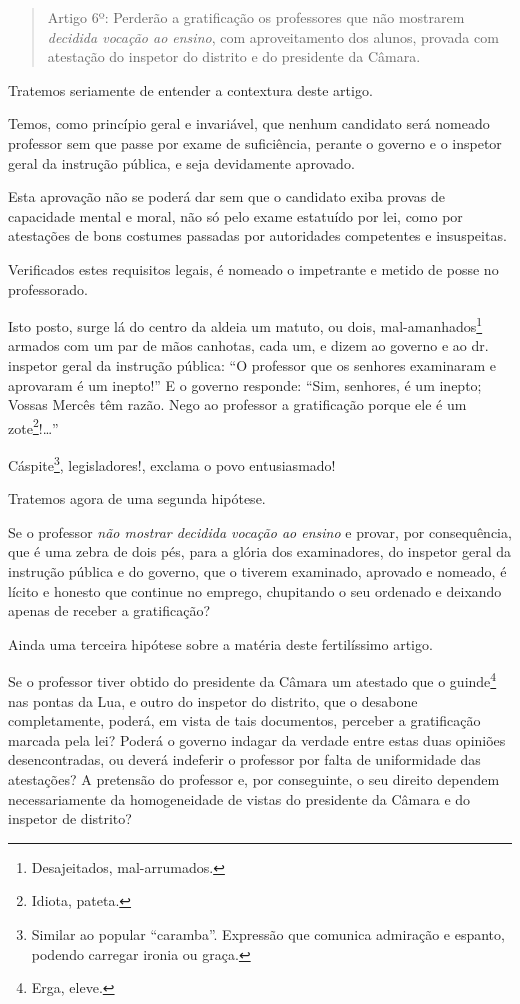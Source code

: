 \begin{quote}
Artigo 6º: Perderão a gratificação os professores que não mostrarem
\emph{decidida vocação ao ensino}, com aproveitamento dos alunos,
provada com atestação do inspetor do distrito e do presidente da
Câmara.
\end{quote}

Tratemos seriamente de entender a contextura deste artigo.

Temos, como princípio geral e invariável, que nenhum candidato será
nomeado professor sem que passe por exame de suficiência, perante o
governo e o inspetor geral da instrução pública, e seja devidamente
aprovado.

Esta aprovação não se poderá dar sem que o candidato exiba provas de
capacidade mental e moral, não só pelo exame estatuído por lei, como por
atestações de bons costumes passadas por autoridades competentes e
insuspeitas.

Verificados estes requisitos legais, é nomeado o impetrante e metido de
posse no professorado.

Isto posto, surge lá do centro da aldeia um matuto, ou dois,
mal-amanhados\footnote{Desajeitados, mal-arrumados.} armados com um
par de mãos canhotas, cada um, e dizem ao governo e ao dr.\,inspetor
geral da instrução pública: ``O professor que os senhores examinaram e
aprovaram é um inepto!'' E o governo responde: ``Sim, senhores, é um
inepto; Vossas Mercês têm razão. Nego ao professor a gratificação porque
ele é um zote\footnote{Idiota, pateta.}!\ldots{}''

Cáspite\footnote{Similar ao popular ``caramba''. Expressão que comunica
  admiração e espanto, podendo carregar ironia ou graça.},
legisladores!, exclama o povo entusiasmado!

Tratemos agora de uma segunda hipótese.

Se o professor \emph{não mostrar decidida vocação ao ensino} e provar,
por consequência, que é uma zebra de dois pés, para a glória dos
examinadores, do inspetor geral da instrução pública e do governo, que o
tiverem examinado, aprovado e nomeado, é lícito e honesto que continue
no emprego, chupitando o seu ordenado e deixando apenas de receber a
gratificação?

Ainda uma terceira hipótese sobre a matéria deste fertilíssimo artigo.

Se o professor tiver obtido do presidente da Câmara um atestado que o
guinde\footnote{Erga, eleve.} nas pontas da Lua, e outro do inspetor
do distrito, que o desabone completamente, poderá, em vista de tais
documentos, perceber a gratificação marcada pela lei? Poderá o governo
indagar da verdade entre estas duas opiniões desencontradas, ou deverá
indeferir o professor por falta de uniformidade das atestações? A
pretensão do professor e, por conseguinte, o seu direito dependem
necessariamente da homogeneidade de vistas do presidente da Câmara e do
inspetor de distrito?

